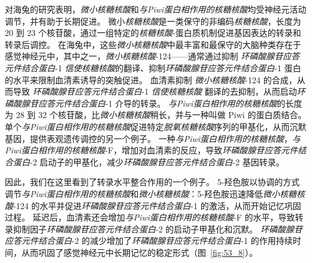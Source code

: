 对海兔的研究表明，\textit{微小核糖核酸}和\textit{与Piwi蛋白相作用的核糖核酸}均受神经元活动调节，并有助于长期促进。
微小\textit{核糖核酸}是一类保守的非编码\textit{核糖核酸}，长度为 20 到 23 个核苷酸，通过一组特定的\textit{核糖核酸}-蛋白质机制促进基因表达的转录和转录后调控。
在海兔中，这些\textit{微小核糖核酸}中最丰富和最保守的大脑种类存在于感觉神经元中，其中之一，\textit{微小核糖核酸}-124——通常通过抑制 \textit{环磷酸腺苷应答元件结合蛋白}-1 \textit{信使核糖核酸}的翻译、抑制\textit{环磷酸腺苷应答元件结合蛋白}-1 蛋白的水平来限制血清素诱导的突触促进。
血清素抑制 \textit{微小核糖核酸}-124 的合成，从而导致 \textit{环磷酸腺苷应答元件结合蛋白}-1 \textit{信使核糖核酸} 翻译的去抑制，从而启动\textit{环磷酸腺苷应答元件结合蛋白}-1 介导的转录。
\textit{与Piwi蛋白相作用的核糖核酸}的长度为 28 到 32 个核苷酸，比\textit{微小核糖核酸}稍长，并与一种叫做 Piwi 的蛋白质结合。
单个\textit{与Piwi蛋白相作用的核糖核酸}促进特定\textit{脱氧核糖核酸}序列的甲基化，从而沉默基因，提供表观遗传调控的另一个例子。
一种\textit{与Piwi蛋白相作用的核糖核酸}，\textit{与Piwi蛋白相作用的核糖核酸}-F，增加对血清素的反应，导致\textit{环磷酸腺苷应答元件结合蛋白}-2 启动子的甲基化，减少\textit{环磷酸腺苷应答元件结合蛋白}-2 基因转录。


因此，我们在这里看到了转录水平整合作用的一个例子。
5-羟色胺以协调的方式调节\textit{与Piwi蛋白相作用的核糖核酸}和\textit{微小核糖核酸}：5-羟色胺迅速降低\textit{微小核糖核酸}-124 的水平并促进\textit{环磷酸腺苷应答元件结合蛋白}-1 的激活，从而开始记忆巩固过程。
延迟后，血清素还会增加\textit{与Piwi蛋白相作用的核糖核酸}-F 的水平，导致转录抑制因子\textit{环磷酸腺苷应答元件结合蛋白}-2 的启动子甲基化和沉默。
\textit{环磷酸腺苷应答元件结合蛋白}-2 的减少增加了\textit{环磷酸腺苷应答元件结合蛋白}-1 的作用持续时间，从而巩固了感觉神经元中长期记忆的稳定形式（图~\ref{fig:53_8}）。


